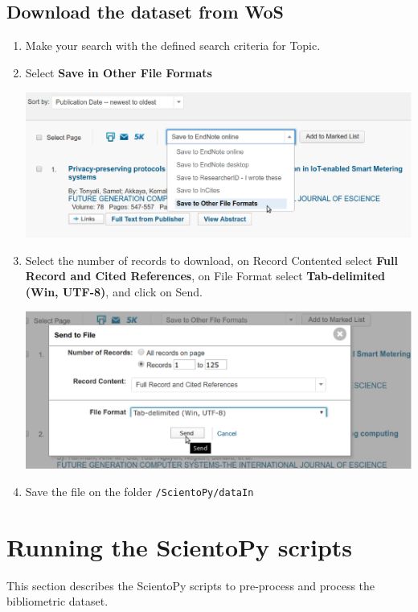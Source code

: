 \documentclass[10pt,letterpaper]{article}
\begin{document}
\subsection{Download the dataset from WoS}
\begin{enumerate}
\item Make your search with the defined search criteria for Topic. 
\item Select \textbf{Save in Other File Formats}
	\begin{center}
		\includegraphics[scale=0.33]{./figures/wos1.eps}
	\end{center}

\item Select the number of records to download, on Record Contented select \textbf{Full Record and Cited References}, on File Format select \textbf{Tab-delimited (Win, UTF-8)}, and click on Send.
	\begin{center}
		\includegraphics[scale=0.33]{./figures/wos2.eps}
	\end{center}

\item Save the file on the folder \verb|/ScientoPy/dataIn|
\end{enumerate}

\section{Running the ScientoPy scripts}

This section describes the ScientoPy scripts to pre-process and process the bibliometric dataset. 
\end{document}
